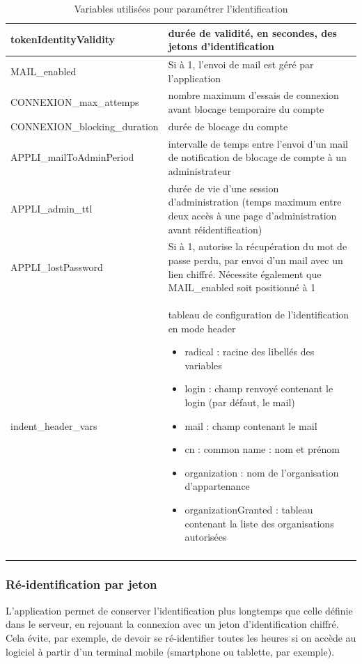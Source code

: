 \begin{longtable}{|p{6cm}|p{10cm}|}
\hline
tokenIdentityValidity & durée de validité, en secondes, des jetons d'identification\\
\hline
MAIL\_enabled & Si à 1, l'envoi de mail est géré par l'application \\
\hline
CONNEXION\_max\_attemps & nombre maximum d'essais de connexion avant blocage temporaire du compte \\
\hline
CONNEXION\_blocking\_duration & durée de blocage du compte \\
\hline
APPLI\_mailToAdminPeriod & intervalle de temps entre l'envoi d'un mail de notification de blocage de compte à un administrateur \\
\hline
APPLI\_admin\_ttl & durée de vie d'une session d'administration (temps maximum entre deux accès à une page d'administration avant réidentification) \\
\hline
APPLI\_lostPassword & Si à 1, autorise la récupération du mot de passe perdu, par envoi d'un mail avec un lien chiffré. Nécessite également que MAIL\_enabled soit positionné à 1 \\
\hline
indent\_header\_vars & tableau de configuration de l'identification en mode header
\begin{itemize}
	\item radical : racine des libellés des variables
	\item login : champ renvoyé contenant le login (par défaut, le mail)
	\item mail : champ contenant le mail
	\item cn : common name : nom et prénom
	\item organization : nom de l'organisation d'appartenance
	\item organizationGranted : tableau contenant la liste des organisations autorisées
\end{itemize}
\\
\hline

\caption{Variables utilisées pour paramétrer l'identification}
\end{longtable}

\subsubsection{Ré-identification par jeton}

L'application permet de conserver l'identification plus longtemps que celle définie dans le serveur, en rejouant la connexion avec un jeton d'identification chiffré. Cela évite, par exemple, de devoir se ré-identifier toutes les heures si on accède au logiciel à partir d'un terminal mobile (smartphone ou tablette, par exemple).

